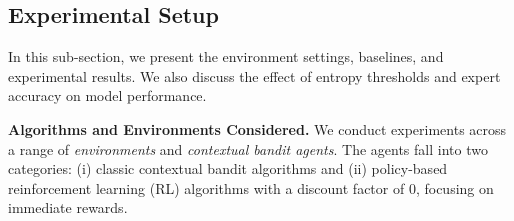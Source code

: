 
\subsection{Experimental Setup}
In this sub-section, we present the environment settings, baselines, and experimental results. We also discuss the effect of entropy thresholds and expert accuracy on model performance.

\textbf{Algorithms and Environments Considered.}  
We conduct experiments across a range of \emph{environments} and \emph{contextual bandit agents}. The agents fall into two categories: (i) classic contextual bandit algorithms and (ii) policy-based reinforcement learning (RL) algorithms with a discount factor of $0$, focusing on immediate rewards.

